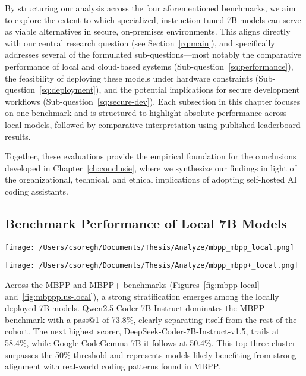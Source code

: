 By structuring our analysis across the four aforementioned benchmarks, we aim to explore the extent to which specialized, instruction-tuned 7B models can serve as viable alternatives in secure, on-premises environments. This aligns directly with our central research question (see Section~\ref{rq:main}), and specifically addresses several of the formulated sub-questions—most notably the comparative performance of local and cloud-based systems (Sub-question~\ref{sq:performance}), the feasibility of deploying these models under hardware constraints (Sub-question~\ref{sq:deployment}), and the potential implications for secure development workflows (Sub-question~\ref{sq:secure-dev}). Each subsection in this chapter focuses on one benchmark and is structured to highlight absolute performance across local models, followed by comparative interpretation using published leaderboard results.

Together, these evaluations provide the empirical foundation for the conclusions developed in Chapter~\ref{ch:conclusie}, where we synthesize our findings in light of the organizational, technical, and ethical implications of adopting self-hosted AI coding assistants.

\subsection{Benchmark Performance of Local 7B Models}


\begin{center}
	\texttt{[image: /Users/csoregh/Documents/Thesis/Analyze/mbpp\_mbpp\_local.png]}
	\label{fig:mbpp-local}
\end{center}

\begin{center}
	\texttt{[image: /Users/csoregh/Documents/Thesis/Analyze/mbpp\_mbpp+\_local.png]}
	\label{fig:mbppplus-local}
\end{center}

Across the MBPP and MBPP+ benchmarks (Figures~\ref{fig:mbpp-local} and~\ref{fig:mbppplus-local}), a strong stratification emerges among the locally deployed 7B models. Qwen2.5-Coder-7B-Instruct dominates the MBPP benchmark with a pass@1 of 73.8\%, clearly separating itself from the rest of the cohort. The next highest scorer, DeepSeek-Coder-7B-Instruct-v1.5, trails at 58.4\%, while Google-CodeGemma-7B-it follows at 50.4\%. This top-three cluster surpasses the 50\% threshold and represents models likely benefiting from strong alignment with real-world coding patterns found in MBPP.

